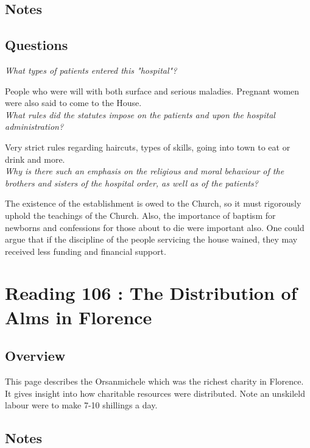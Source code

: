 \documentclass[12pt]{article}
\begin{document}
\subsection*{Notes}

\subsection*{Questions}

\textit{What types of patients entered this "hospital"?}

People who were will with both surface and serious maladies. Pregnant women were also said to come to the House.\\

\textit{What rules did the statutes impose on the patients and upon the hospital administration?}

Very strict rules regarding haircuts, types of skills, going into town to eat or drink and more.\\

\textit{Why is there such an emphasis on the religious and moral behaviour of the brothers and sisters of the hospital order, as well as of the patients?}

The existence of the establishment is owed to the Church, so it must rigorously uphold the teachings of the Church. Also, the importance of baptism for newborns and confessions for those about to die were important also. One could argue that if the discipline of the people servicing the house wained, they may received less funding and financial support. \\

\section*{Reading 106 : The Distribution of Alms in Florence}

\subsection*{Overview}

This page describes the Orsanmichele which was the richest charity in Florence. It gives insight into how charitable resources were distributed. Note an unskileld labour were to make 7-10 shillings a day.

\subsection*{Notes}
\end{document}
